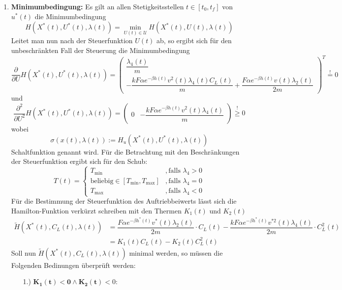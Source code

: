 \begin{enumerate}
    \item \textbf{Minimumbedingung:} Es gilt an allen Stetigkeitsstellen $t \in [t_0,t_f]$ von $u^{\ast}(t)$ die Minimumbedingung \[H(X^{\ast}(t),U^{\ast}(t),\lambda(t)) = \min_{U(t) \in \mathcal{U}} H(X^{\ast}(t),U(t),\lambda(t))\] Leitet man nun nach der Steuerfunktion $U(t)$ ab, so ergibt sich für den unbeschränkten Fall der Steuerung die Minimumbedingung
    \[\dfrac{\partial}{\partial U} H(X^{\ast}(t),U^{\ast}(t),\lambda(t)) = \begin{pmatrix}
    \dfrac{\lambda_4(t)}{m} \\ 
    - \dfrac{k F \alpha e^{-\beta h(t)} v^2(t) \lambda_4(t) C_L(t)}{m} + \dfrac{F \alpha e^{-\beta h(t)} v(t) \lambda_2(t)}{2m}
    \end{pmatrix}^T \stackrel{!}{=} 0\]
    und 
    \[\dfrac{\partial^2}{\partial U^2} H(X^{\ast}(t),U^{\ast}(t),\lambda(t)) = \begin{pmatrix}
    0 & - \dfrac{k F \alpha e^{-\beta h(t)} v^2(t) \lambda_4(t)}{m} 
    \end{pmatrix} \stackrel{!}{\geq} 0\] wobei \[\sigma(x(t),\lambda(t)) := H_u(X^{\ast}(t),U^{\ast}(t),\lambda(t))\] Schaltfunktion genannt wird. Für die Betrachtung mit den Beschränkungen der Steuerfunktion ergibt sich für den Schub:
\[T(t) = \left\lbrace \begin{array}{ll}
T_{\min} & ,\text{falls } \lambda_4 > 0  \\ 
\text{beliebig} \in [T_{\min},T_{\max}] & ,\text{falls } \lambda_4 = 0  \\ 
T_{\max} & ,\text{falls } \lambda_4 < 0
\end{array} \right.\]
Für die Bestimmung der Steuerfunktion des Auftriebbeiwerts lässt sich die Hamilton-Funktion verkürzt schreiben mit den Thermen $K_1(t)$ und $K_2(t)$
    \[\begin{split}
        \tilde{H}(X^{\ast}(t),C_L(t),\lambda(t)) &= \dfrac{F \alpha e^{-\beta h^{\ast}(t)} v^{\ast}(t) \lambda_2(t)}{2m} \cdot C_L(t) - \dfrac{k F \alpha e^{-\beta h^{\ast}(t)}  v^{\ast 2}(t) \lambda_4(t)}{2m} \cdot C_L^2(t) \\\
        &= K_1(t) C_L(t) - K_2(t) C_L^2(t)
    \end{split}\]
Soll nun $\tilde{H}(X^{\ast}(t),C_L(t),\lambda(t))$ minimal werden, so müssen die Folgenden Bedinungen überprüft werden:
    \begin{enumerate}
        \item[1.)] $\mathbf{K_1(t) < 0 \wedge K_2(t)} < 0$:

\end{enumerate}
\end{enumerate}
